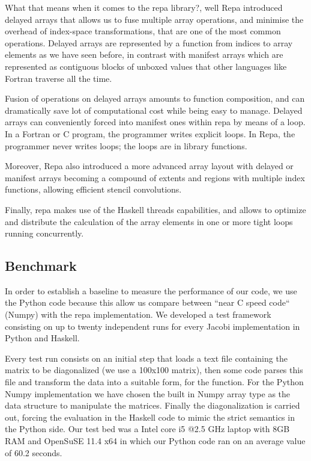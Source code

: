 \documentclass{tmr}
\begin{document}
What that means when it comes to the repa library?, well Repa introduced
delayed arrays that allows us to fuse multiple array operations, and 
minimise the overhead of index-space transformations, that are one of the most
common operations. Delayed arrays are represented by a function from indices 
to array elements as we have seen before, in contrast with manifest arrays
which are represented as contiguous blocks of unboxed values that other 
languages like Fortran traverse all the time. 

Fusion of operations on delayed arrays amounts to function composition, and 
can dramatically save lot of computational cost while being easy to manage. 
Delayed arrays can conveniently forced into manifest ones within repa by means 
of a loop. In a Fortran or C program, the programmer writes explicit loops. 
In Repa, the programmer never writes loops; the loops are in library functions.

Moreover, Repa also introduced a more advanced array layout with delayed or manifest 
arrays becoming a compound of extents and regions with multiple index functions, 
allowing efficient stencil convolutions.

Finally, repa makes use of the Haskell threads capabilities, and allows to optimize and
distribute the calculation of the array elements in one or more tight loops running concurrently.


\subsection{Benchmark}

In order to establish a baseline to measure the performance of our code, 
we use the Python code because this allow us compare between ``near C speed code``
(Numpy) with the repa implementation. We developed a test framework consisting 
on up to twenty independent runs for every Jacobi implementation in Python and Haskell.

Every test run consists on an initial step that loads a text file containing
the matrix to be diagonalized (we use a 100x100 matrix), then some code parses
this file and transform the data into a suitable form, for the  function. 
For the Python Numpy implementation we have chosen the built in Numpy array type
as the data structure to manipulate the matrices. Finally the diagonalization is
carried out, forcing the evaluation in the Haskell code to mimic the strict 
semantics in the Python side. Our test bed was a Intel core i5 @2.5 GHz 
laptop with 8GB RAM and OpenSuSE 11.4 x64 in which our Python code 
ran on an average value of 60.2 seconds. 
\end{document}
